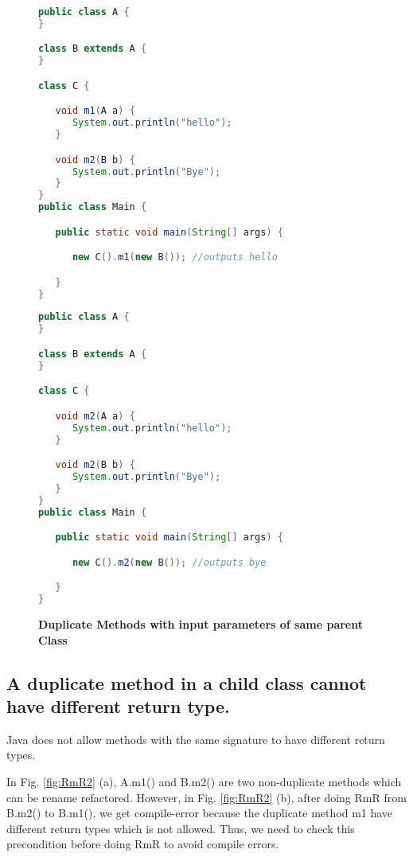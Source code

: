 \begin{figure}[th]
\centering
\begin{minipage}[t]{0.8\linewidth}
\begin{lstlisting}[language=java, basicstyle=\scriptsize\ttfamily,frame=single]
public class A {
}

class B extends A {
}

class C {

   void m1(A a) {
      System.out.println("hello");
   }

   void m2(B b) {
      System.out.println("Bye");
   }
}
public class Main {

   public static void main(String[] args) {

      new C().m1(new B()); //outputs hello

   }
}
\end{lstlisting}
\end{minipage}
\hfill
\begin{minipage}[t]{0.8\linewidth}
\begin{lstlisting}[language=java, basicstyle=\scriptsize\ttfamily,frame=single]
public class A {
}

class B extends A {
}

class C {

   void m2(A a) {
      System.out.println("hello");
   }

   void m2(B b) {
      System.out.println("Bye");
   }
}
public class Main {

   public static void main(String[] args) {

      new C().m2(new B()); //outputs bye

   }
}

\end{lstlisting}
\end{minipage}
\caption{\textbf{Duplicate Methods with input parameters of same parent Class}}
\label{fig:RmR5}
\end{figure}

\subsection{A duplicate method in a child class cannot have different return type.}

Java does not allow methods with the same signature to have different return types.

In Fig. \ref{fig:RmR2} (a), A.m1() and B.m2() are two non-duplicate methods which can be rename refactored. However, in Fig. \ref{fig:RmR2} (b), after doing RmR from B.m2() to B.m1(), we get compile-error because the duplicate method m1 have different return types which is not allowed. Thus, we need to check this precondition before doing RmR to avoid compile errors.

